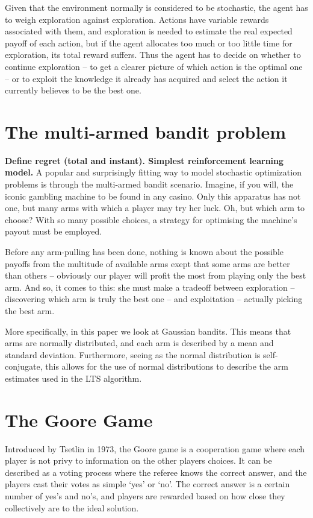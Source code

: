 Given that the environment normally is considered to be stochastic, the agent has to weigh exploration against exploration.
Actions have variable rewards associated with them, and exploration is needed to estimate the real expected payoff of each action, but if the agent allocates too much or too little time for exploration, its total reward suffers.
Thus the agent has to decide on whether to continue exploration -- to get a clearer picture of which action is the optimal one -- or to exploit the knowledge it already has acquired and select the action it currently believes to be the best one.

\section{The multi-armed bandit problem}
\textbf{Define regret (total and instant). Simplest reinforcement learning model.}
A popular and surprisingly fitting way to model stochastic optimization problems 
is through the multi-armed bandit scenario. Imagine, if you will, the iconic 
gambling machine to be found in any casino. Only this apparatus has not one, but 
many arms with which a player may try her luck. Oh, but which arm to choose? 
With so many possible choices, a strategy for optimising the machine’s payout 
must be employed. 

Before any arm-pulling has been done, nothing is known about the possible 
payoffs from the multitude of available arms exept that some arms are better 
than others -- obviously our player will profit the most from playing only the 
best arm. And so, it comes to this: she must make a tradeoff between exploration 
-- discovering which arm is truly the best one -- and exploitation -- actually 
picking the best arm.

More specifically, in this paper we look at Gaussian bandits.
This means that arms are normally distributed, and each arm is described by a mean and standard deviation.
Furthermore, seeing as the normal distribution is self-conjugate, this allows for the
use of normal distributions to describe the arm estimates used in the LTS algorithm.

\section{The Goore Game}
Introduced by Tsetlin in 1973, the Goore game is a cooperation game where each  
player is not privy to information on the other players choices. It can be 
described as a voting process where the referee knows the correct answer, and 
the players cast their votes as simple ‘yes’ or ‘no’. The correct answer is a 
certain number of yes’s and no’s, and players are rewarded based on how close 
they collectively are to the ideal solution.

